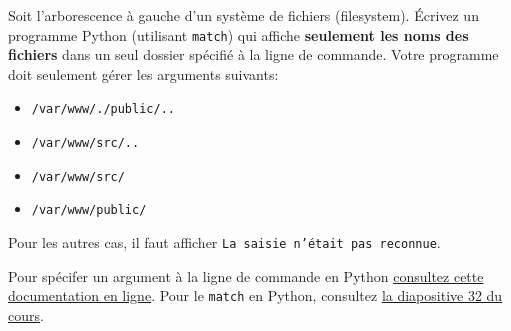 \begin{Exercice}[5 minutes]

\noindent
\begin{minipage}[t]{0.5\textwidth}
\vspace{0pt}
\begin{tcolorbox}[width=2in,colframe=black, boxrule=1pt, left=0pt, right=0pt, top=0pt, bottom=0pt]
\end{tcolorbox}
\end{minipage}%
\hspace{-1.5cm}
\begin{minipage}[t]{0.6\textwidth}
\vspace{0pt}
Soit l'arborescence à gauche d'un système de fichiers (filesystem).
Écrivez un programme Python (utilisant \texttt{match}) qui affiche \textbf{seulement les noms des fichiers} dans un seul dossier spécifié à la ligne de commande. 
Votre programme doit seulement gérer les arguments suivants: \newline 

\begin{itemize}
    \item[$\bullet$] \texttt{/var/www/./public/..}
    \item[$\bullet$] \texttt{/var/www/src/..}
    \item[$\bullet$] \texttt{/var/www/src/}
    \item[$\bullet$] \texttt{/var/www/public/} \newline 
\end{itemize}

Pour les autres cas, il faut afficher \texttt{La saisie n'était pas reconnue}.  
\end{minipage}
\begin{conseil}
Pour spécifer un argument à la ligne de commande en Python \href{https://docs.python.org/fr/3.13/library/sys.html\#sys.argv}{consultez cette documentation en ligne}. Pour le \texttt{match} en Python, consultez \href{https://moodle.unil.ch/mod/resource/view.php?id=2218919}{la diapositive 32 du cours}. 
\end{conseil}



\end{Exercice}
